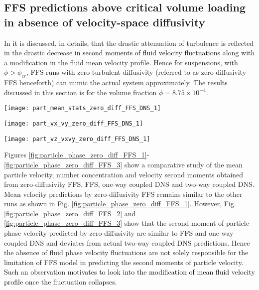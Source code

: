 \documentclass[notitlepage]{revtex4-1}
\begin{document}
\subsection{FFS predictions above critical volume loading in absence of velocity-space diffusivity}
\label{sec:zero_diff_FFS}
In \citet{ghosh2022part1} it is discussed, in details, that the drastic attenuation of turbulence is reflected in the drastic decrease \textcolor{black}{in second moments of fluid velocity fluctuations} along with a modification in the fluid mean velocity profile. Hence for suspensions, with $\phi>\phi_{cr}$, FFS runs with zero turbulent diffusivity  (referred to as zero-diffusivity FFS henceforth) can mimic the actual system approximately. The results discussed in this section is for the volume fraction $\phi=8.75\times10^{-4}$.    
\begin{figure*}[!]
\texttt{[image: part\_mean\_stats\_zero\_diff\_FFS\_DNS\_1]}
			\caption{Comparison of (a) mean velocity, (b)  number concentration of particle phase obtained from one-way DNS, two-way DNS and FFS model in absence of velocity-space diffusivity for $\phi=8.75\times10^{-4}>\phi_{cr}$} 
			\label{fig:particle_phase_zero_diff_FFS_1}
\end{figure*}
\begin{figure*}[!]
			\texttt{[image: part\_vx\_vy\_zero\_diff\_FFS\_DNS\_1]}
			\caption{Comparison of (a) streamwise mean square velocity, (b)  cross-stream mean square velocity of particle phase obtained from one-way DNS, two-way DNS, FFS and FFS model in absence of velocity-space diffusivity for $\phi=8.75\times10^{-4}>\phi_{cr}$}
			\label{fig:particle_phase_zero_diff_FFS_2}
\end{figure*} 
\begin{figure*}[!]
\texttt{[image: part\_vz\_vxvy\_zero\_diff\_FFS\_DNS\_1]}
			\caption{Comparison of (a) spanwise mean square velocity, (b) streamwise and cross-stream velocity cross-correlation of the particle phase obtained from one-way DNS, two-way DNS, FFS and FFS model in absence of velocity-space diffusivity for $\phi=8.75\times10^{-4}>\phi_{cr}$} 
			\label{fig:particle_phase_zero_diff_FFS_3}
\end{figure*}
Figures \ref{fig:particle_phase_zero_diff_FFS_1}-\ref{fig:particle_phase_zero_diff_FFS_3} show a comparative study of the mean particle velocity, number concentration and velocity second moments obtained from zero-diffusivity FFS, FFS, one-way coupled DNS and two-way coupled DNS. Mean velocity predictions by zero-diffusivity FFS remains similar to the other runs as shown in Fig. \ref{fig:particle_phase_zero_diff_FFS_1}. However, Fig. \ref{fig:particle_phase_zero_diff_FFS_2} and \ref{fig:particle_phase_zero_diff_FFS_3} show that the second moment of particle-phase velocity predicted by zero-diffusivity are similar to FFS and one-way coupled DNS and deviates from actual two-way coupled DNS predictions. Hence the absence of fluid phase velocity fluctuations are not solely responsible for the limitation of FFS model in predicting the second moments of particle velocity.
\textcolor{black}{Such an observation motivates to look into the modification of mean fluid velocity profile once the fluctuation collapses.}
\end{document}
